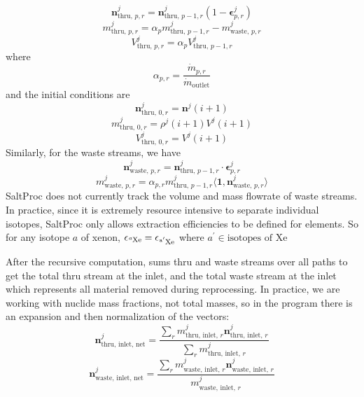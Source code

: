 \begin{equation}
    \mathbf{n}^{j}_{\text{thru, }p,r} = \mathbf{n}^{j}_{\text{thru, }p-1,r} (1 - \pmb{\epsilon}^{j}_{p,r})
\end{equation}
\begin{equation}
    m^{j}_{\text{thru, } p,r} = \alpha_{p} m^{j}_{\text{thru, }p-1,r} - m^{j}_{\text{waste, }p,r}
\end{equation}
\begin{equation}
    V^{j}_{\text{thru, }p,r} = \alpha_{p}V^{j}_{\text{thru, }p-1,r}
\end{equation}
where 
\begin{equation}
    \alpha_{p,r} = \frac{\dot{m}_{p,r}}{\dot{m}_{\text{outlet}}}
\end{equation}
and the initial conditions are 
\begin{equation}
    \mathbf{n}^{j}_{\text{thru, }0,r} = \mathbf{n}^{j}(i+1)
\end{equation}
\begin{equation}
    m^{j}_{\text{thru, }0,r} = \rho^{j}(i+1)V^{j}(i+1)
\end{equation}
\begin{equation}
    V^{j}_{\text{thru, }0,r} = V^{j}(i+1)
\end{equation}
Similarly, for the waste streams, we have
\begin{equation}
    \mathbf{n}^{j}_{\text{waste, }p,r} = \mathbf{n}^{j}_{\text{thru, }p-1,r} \cdot \pmb{\epsilon}^{j}_{p,r}
\end{equation}
\begin{equation}
    m^{j}_{\text{waste, }p,r} = \alpha_{p,r} m^{j}_{\text{thru, }p-1,r} \langle\mathbf{1},\mathbf{n}^{j}_{\text{waste, }p,r}\rangle
\end{equation}
SaltProc does not currently track the volume and mass flowrate of waste streams.
In practice, since it is extremely resource intensive to separate individual
isotopes, SaltProc only allows extraction efficiencies to be defined for
elements. So for any isotope $a$ of xenon,
$\epsilon_{\ce{^{a}Xe}} = \epsilon_{\ce{^{a^{\prime}}Xe}}$  where
$a^{\prime} \in \text{isotopes of Xe}$

After the recursive computation, \SaltProc sums thru and waste streams over all
paths to get the total thru stream at the inlet, and the total waste stream at
the inlet which represents all material removed during reprocessing. In practice,
we are working with nuclide mass fractions, not total masses, so in the program
there is an expansion and then normalization of the vectors:
\begin{equation}
    \mathbf{n}^{j}_\text{thru, inlet, net} = \frac{\sum_{r} m^{j}_{\text{thru, inlet, }r} \mathbf{n}^{j}_{\text{thru, inlet, }r}}{\sum_{r} m^{j}_{\text{thru, inlet, }r}}
\end{equation}
\begin{equation}
    \mathbf{n}^{j}_{\text{waste, inlet, net}} = \frac{\sum_{r} m^{j}_{\text{waste, inlet, }r} \mathbf{n}^{j}_{\text{waste, inlet, }r}}{m^{j}_{\text{waste, inlet, }r}}
\end{equation}

